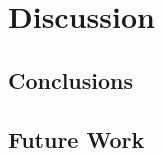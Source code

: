 


\chapter{Discussion}

\label{chapter:discussion}

\section{Conclusions}

\section{Future Work}


